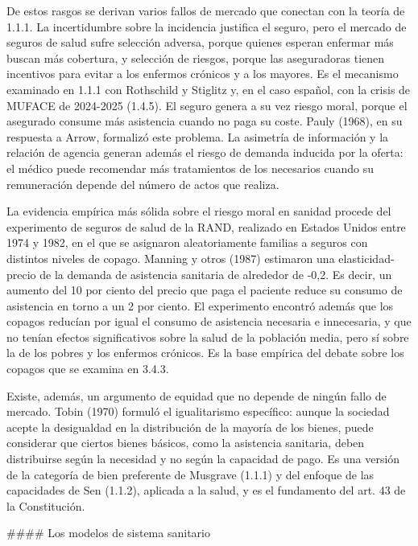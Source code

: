\documentclass[10pt,a4paper]{article}
\begin{document}
De estos rasgos se derivan varios fallos de mercado que conectan con la teoría de 1.1.1. La incertidumbre sobre la incidencia justifica el seguro, pero el mercado de seguros de salud sufre selección adversa, porque quienes esperan enfermar más buscan más cobertura, y selección de riesgos, porque las aseguradoras tienen incentivos para evitar a los enfermos crónicos y a los mayores. Es el mecanismo examinado en 1.1.1 con Rothschild y Stiglitz y, en el caso español, con la crisis de MUFACE de 2024-2025 (1.4.5). El seguro genera a su vez riesgo moral, porque el asegurado consume más asistencia cuando no paga su coste. Pauly (1968), en su respuesta a Arrow, formalizó este problema. La asimetría de información y la relación de agencia generan además el riesgo de demanda inducida por la oferta: el médico puede recomendar más tratamientos de los necesarios cuando su remuneración depende del número de actos que realiza.

La evidencia empírica más sólida sobre el riesgo moral en sanidad procede del experimento de seguros de salud de la RAND, realizado en Estados Unidos entre 1974 y 1982, en el que se asignaron aleatoriamente familias a seguros con distintos niveles de copago. Manning y otros (1987) estimaron una elasticidad-precio de la demanda de asistencia sanitaria de alrededor de -0,2. Es decir, un aumento del 10 por ciento del precio que paga el paciente reduce su consumo de asistencia en torno a un 2 por ciento. El experimento encontró además que los copagos reducían por igual el consumo de asistencia necesaria e innecesaria, y que no tenían efectos significativos sobre la salud de la población media, pero sí sobre la de los pobres y los enfermos crónicos. Es la base empírica del debate sobre los copagos que se examina en 3.4.3.

Existe, además, un argumento de equidad que no depende de ningún fallo de mercado. Tobin (1970) formuló el igualitarismo específico: aunque la sociedad acepte la desigualdad en la distribución de la mayoría de los bienes, puede considerar que ciertos bienes básicos, como la asistencia sanitaria, deben distribuirse según la necesidad y no según la capacidad de pago. Es una versión de la categoría de bien preferente de Musgrave (1.1.1) y del enfoque de las capacidades de Sen (1.1.2), aplicada a la salud, y es el fundamento del art. 43 de la Constitución.

#### Los modelos de sistema sanitario
\end{document}
